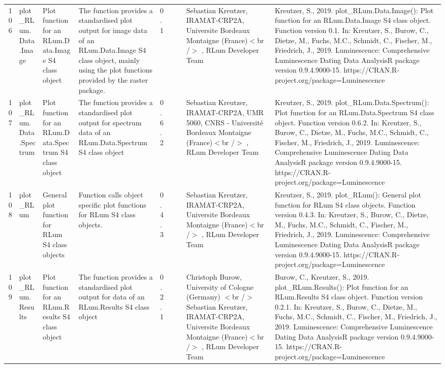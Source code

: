 \begin{table}[ht]
\begin{tabular}{rllllllll}
 \\ 
  106 & plot\_RLum.Data.Image & Plot function for an  RLum.Data.Image  S4 class object & The function provides a standardised plot output for image data of an RLum.Data.Image S4 class object, mainly using the plot functions provided by the  raster  package. & 0.1
 &  &  & Sebastian Kreutzer, IRAMAT-CRP2A, Universite Bordeaux Montaigne (France)$<$br /$>$ , RLum Developer Team & Kreutzer, S., 2019. plot\_RLum.Data.Image(): Plot function for an RLum.Data.Image S4 class object. Function version 0.1. In: Kreutzer, S., Burow, C., Dietze, M., Fuchs, M.C., Schmidt, C., Fischer, M., Friedrich, J., 2019. Luminescence: Comprehensive Luminescence Dating Data AnalysisR package version 0.9.4.9000-15. https://CRAN.R-project.org/package=Luminescence
 \\ 
  107 & plot\_RLum.Data.Spectrum & Plot function for an RLum.Data.Spectrum S4 class object & The function provides a standardised plot output for spectrum data of an RLum.Data.Spectrum S4 class object & 0.6.2
 &  &  & Sebastian Kreutzer, IRAMAT-CRP2A, UMR 5060, CNRS - Université Bordeaux Montaigne (France)$<$br /$>$ , RLum Developer Team & Kreutzer, S., 2019. plot\_RLum.Data.Spectrum(): Plot function for an RLum.Data.Spectrum S4 class object. Function version 0.6.2. In: Kreutzer, S., Burow, C., Dietze, M., Fuchs, M.C., Schmidt, C., Fischer, M., Friedrich, J., 2019. Luminescence: Comprehensive Luminescence Dating Data AnalysisR package version 0.9.4.9000-15. https://CRAN.R-project.org/package=Luminescence
 \\ 
  108 & plot\_RLum & General plot function for RLum S4 class objects & Function calls object specific plot functions for RLum S4 class objects. & 0.4.3
 &  &  & Sebastian Kreutzer, IRAMAT-CRP2A, Universite Bordeaux Montaigne (France)$<$br /$>$ , RLum Developer Team & Kreutzer, S., 2019. plot\_RLum(): General plot function for RLum S4 class objects. Function version 0.4.3. In: Kreutzer, S., Burow, C., Dietze, M., Fuchs, M.C., Schmidt, C., Fischer, M., Friedrich, J., 2019. Luminescence: Comprehensive Luminescence Dating Data AnalysisR package version 0.9.4.9000-15. https://CRAN.R-project.org/package=Luminescence
 \\ 
  109 & plot\_RLum.Results & Plot function for an RLum.Results S4 class object & The function provides a standardised plot output for data of an RLum.Results S4 class object & 0.2.1
 &  &  & Christoph Burow, University of Cologne (Germany)  $<$br /$>$ Sebastian Kreutzer, IRAMAT-CRP2A, Universite Bordeaux Montaigne (France)$<$br /$>$ , RLum Developer Team & Burow, C., Kreutzer, S., 2019. plot\_RLum.Results(): Plot function for an RLum.Results S4 class object. Function version 0.2.1. In: Kreutzer, S., Burow, C., Dietze, M., Fuchs, M.C., Schmidt, C., Fischer, M., Friedrich, J., 2019. Luminescence: Comprehensive Luminescence Dating Data AnalysisR package version 0.9.4.9000-15. https://CRAN.R-project.org/package=Luminescence

\end{tabular}
\end{table}
